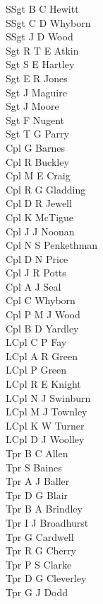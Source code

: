\begin{multicols}{2}
  \noindent
  SSgt B C Hewitt \\
  SSgt C D Whyborn \\
  SSgt J D Wood \\
  Sgt R T E Atkin \\
  Sgt S E Hartley \\
  Sgt E R Jones \\
  Sgt J Maguire \\
  Sgt J Moore \\
  Sgt F Nugent \\
  Sgt T G Parry \\
  Cpl G Barnes \\
  Cpl R Buckley \\
  Cpl M E Craig \\
  Cpl R G Gladding \\
  Cpl D R Jewell \\
  Cpl K McTigue \\
  Cpl J J Noonan \\
  Cpl N S Penkethman \\
  Cpl D N Price \\
  Cpl J R Potts \\
  Cpl A J Seal \\
  Cpl C Whyborn \\
  Cpl P M J Wood \\
  Cpl B D Yardley \\
  LCpl C P Fay \\
  LCpl A R Green \\
  LCpl P Green \\
  LCpl R E Knight \\
  LCpl N J Swinburn \\
  LCpl M J Townley \\
  LCpl K W Turner \\
  LCpl D J Woolley \\
  Tpr B C Allen \\
  Tpr S Baines \\
  Tpr A J Baller \\
  Tpr D G Blair \\
  Tpr B A Brindley \\
  Tpr I J Broadhurst \\
  Tpr G Cardwell \\
  Tpr R G Cherry \\
  Tpr P S Clarke \\
  Tpr D G Cleverley \\
  Tpr G J Dodd \\

\end{multicols}
